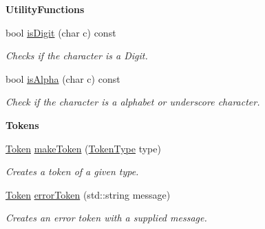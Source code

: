\begin{Indent}\textbf{ Utility\+Functions}\par
\begin{DoxyCompactItemize}
\item 
bool \hyperlink{class_scanner_aa57431c2670899fefef67a7a7b307bd5}{is\+Digit} (char c) const
\begin{DoxyCompactList}\small\item\em Checks if the character is a Digit. \end{DoxyCompactList}\item 
bool \hyperlink{class_scanner_abc53d5d5a9051982708dc090a8977381}{is\+Alpha} (char c) const
\begin{DoxyCompactList}\small\item\em Check if the character is a alphabet or underscore character. \end{DoxyCompactList}\end{DoxyCompactItemize}
\end{Indent}
\begin{Indent}\textbf{ Tokens}\par
\begin{DoxyCompactItemize}
\item 
\hyperlink{struct_token}{Token} \hyperlink{class_scanner_a67c546b078ac1e6780aa5ded2bfc4754}{make\+Token} (\hyperlink{_scanner_8h_aa520fbf142ba1e7e659590c07da31921}{Token\+Type} type)
\begin{DoxyCompactList}\small\item\em Creates a token of a given type. \end{DoxyCompactList}\item 
\hyperlink{struct_token}{Token} \hyperlink{class_scanner_ad397e5672820f6200043a1c885404e9b}{error\+Token} (std\+::string message)
\begin{DoxyCompactList}\small\item\em Creates an error token with a supplied message. \end{DoxyCompactList}\end{DoxyCompactItemize}
\end{Indent}
